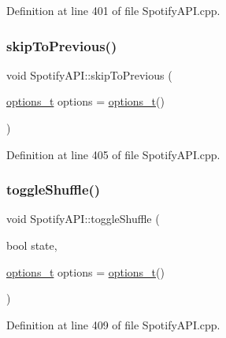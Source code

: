 Definition at line 401 of file Spotify\+A\+P\+I.\+cpp.

\mbox{\label{class_spotify_a_p_i_acefe16c25aeac587c9f7bf533088394f}} 
\subsubsection{\texorpdfstring{skip\+To\+Previous()}{skipToPrevious()}}
{\footnotesize\ttfamily void Spotify\+A\+P\+I\+::skip\+To\+Previous (\begin{DoxyParamCaption}\item[{\mbox{\hyperlink{_spotify_a_p_i_8h_a0ff5cac1a4007bb330b7d9939650c283}{options\+\_\+t}}}]{options = {\ttfamily \mbox{\hyperlink{_spotify_a_p_i_8h_a0ff5cac1a4007bb330b7d9939650c283}{options\+\_\+t}}()} }\end{DoxyParamCaption})}



Definition at line 405 of file Spotify\+A\+P\+I.\+cpp.

\mbox{\label{class_spotify_a_p_i_a7afa71cbe1d9b1b19df7ea98d2e5780c}} 
\subsubsection{\texorpdfstring{toggle\+Shuffle()}{toggleShuffle()}}
{\footnotesize\ttfamily void Spotify\+A\+P\+I\+::toggle\+Shuffle (\begin{DoxyParamCaption}\item[{bool}]{state,  }\item[{\mbox{\hyperlink{_spotify_a_p_i_8h_a0ff5cac1a4007bb330b7d9939650c283}{options\+\_\+t}}}]{options = {\ttfamily \mbox{\hyperlink{_spotify_a_p_i_8h_a0ff5cac1a4007bb330b7d9939650c283}{options\+\_\+t}}()} }\end{DoxyParamCaption})}



Definition at line 409 of file Spotify\+A\+P\+I.\+cpp.

\mbox{\label{class_spotify_a_p_i_a46ef00092fadc47a398e5600facfb295}} 
